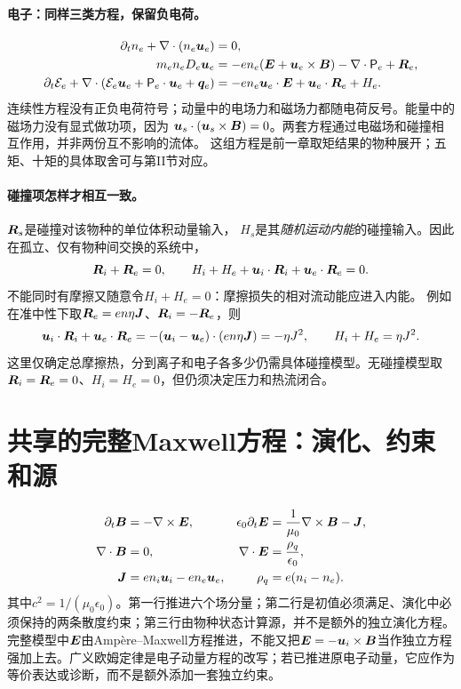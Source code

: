 \paragraph{电子：同样三类方程，保留负电荷。}
\begin{align}
 \partial_t n_e+\nabla\cdot(n_e\bm{u}_e)&=0,
 \label{hall:eq:electron-cont-full}\\
 m_en_eD_e\bm{u}_e
 &=-en_e(\bm{E}+\bm{u}_e\times\bm{B})-\nabla\cdot\mathsf P_e+\bm{R}_e,
 \label{hall:eq:electron-mom-full}\\
 \partial_t\mathcal E_e+
 \nabla\cdot(\mathcal E_e\bm{u}_e+\mathsf P_e\cdot\bm{u}_e+\bm{q}_e)
 &=-en_e\bm{u}_e\cdot\bm{E}+\bm{u}_e\cdot\bm{R}_e+H_e.
 \label{hall:eq:electron-energy-full}
\end{align}
连续性方程没有正负电荷符号；动量中的电场力和磁场力都随电荷反号。能量中的磁场力没有显式做功项，因为
$\bm{u}_s\cdot(\bm{u}_s\times\bm{B})=0$。两套方程通过电磁场和碰撞相互作用，并非两份互不影响的流体。
这组方程是前一章取矩结果的物种展开；五矩、十矩的具体取舍可与\citet{Wang2015}第II节对应。

\paragraph{碰撞项怎样才相互一致。}
$\bm{R}_s$是碰撞对该物种的单位体积动量输入，
$H_s$是其\emph{随机运动内能}的碰撞输入。因此在孤立、仅有物种间交换的系统中，
\begin{equation}
 \bm{R}_i+\bm{R}_e=0,\qquad
 H_i+H_e+\bm{u}_i\cdot\bm{R}_i+\bm{u}_e\cdot\bm{R}_e=0.
 \label{hall:eq:twofluid-collision-consistency}
\end{equation}
不能同时有摩擦又随意令$H_i+H_e=0$：摩擦损失的相对流动能应进入内能。
例如在准中性下取$\bm{R}_e=en\eta\bm{J}$、$\bm{R}_i=-\bm{R}_e$，则
\begin{equation}
 \bm{u}_i\cdot\bm{R}_i+\bm{u}_e\cdot\bm{R}_e
 =-(\bm{u}_i-\bm{u}_e)\cdot(en\eta\bm{J})=-\eta J^2,
 \qquad H_i+H_e=\eta J^2.
\end{equation}
这里仅确定总摩擦热，分到离子和电子各多少仍需具体碰撞模型。无碰撞模型取$\bm{R}_i=\bm{R}_e=0$、$H_i=H_e=0$，但仍须决定压力和热流闭合。

\section{共享的完整Maxwell方程：演化、约束和源}
\begin{align}
 \partial_t\bm{B}&=-\nabla\times\bm{E},
 &\epsilon_0\partial_t\bm{E}&=\frac1{\mu_0}\nabla\times\bm{B}-\bm{J},
 \label{hall:eq:twofluid-maxwell-evolve}\\
 \nabla\cdot\bm{B}&=0,
 &\nabla\cdot\bm{E}&=\frac{\rho_q}{\epsilon_0},
 \label{hall:eq:twofluid-maxwell-constraints}\\
 \bm{J}&=en_i\bm{u}_i-en_e\bm{u}_e,
 &\rho_q&=e(n_i-n_e).
 \label{hall:eq:twofluid-sources}
\end{align}
其中$c^2=1/(\mu_0\epsilon_0)$。第一行推进六个场分量；第二行是初值必须满足、演化中必须保持的两条散度约束；第三行由物种状态计算源，并不是额外的独立演化方程。
完整模型中$\bm{E}$由Ampère--Maxwell方程推进，不能又把$\bm{E}=-\bm{u}_i\times\bm{B}$当作独立方程强加上去。广义欧姆定律是电子动量方程的改写；若已推进原电子动量，它应作为等价表达或诊断，而不是额外添加一套独立约束。

